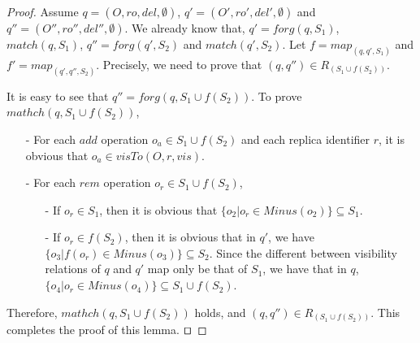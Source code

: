 \begin {proof}
Assume $q=(O,\mathit{ro},\mathit{del},\emptyset)$, $q'=(O',\mathit{ro}',\mathit{del}',\emptyset)$ and $q''=(O'',\mathit{ro}'',\mathit{del}'',\emptyset)$. We already know that, $q' = forg(q,S_1)$, $match(q,S_1)$, $q'' = forg(q',S_2)$ and $match(q',S_2)$. Let $f = map_{(q,q',S_1)}$ and $f' = map_{(q',q'',S_2)}$. Precisely, we need to prove that $(q,q'') \in R_{ ( S_1 \cup f(S_2) ) }$.

It is easy to see that $q'' = forg(q,S_1 \cup f(S_2))$. To prove $mathch(q,S_1 \cup f(S_2))$,

\begin{itemize}
\setlength{\itemsep}{0.5pt}
\item[-] For each $add$ operation $o_a \in S_1 \cup f(S_2)$ and each replica identifier $r$, it is obvious that $o_a \in visTo(O,r,vis)$.

\item[-] For each $rem$ operation $o_r \in S_1 \cup f(S_2)$,

    \begin{itemize}
    \setlength{\itemsep}{0.5pt}
    \item[-] If $o_r \in S_1$, then it is obvious that $\{ o_2 \vert o_r \in Minus(o_2) \} \subseteq S_1$.

    \item[-] If $o_r \in f(S_2)$, then it is obvious that in $q'$, we have $\{ o_3 \vert f(o_r) \in Minus(o_3) \} \subseteq S_2$. Since the different between visibility relations of $q$ and $q'$ map only be that of $S_1$, we have that in $q$, $\{ o_4 \vert o_r \in Minus(o_4) \} \subseteq S_1 \cup f(S_2)$.
    \end{itemize}
\end{itemize}

Therefore, $mathch(q,S_1 \cup f(S_2))$ holds, and $(q,q'') \in R_{ ( S_1 \cup f(S_2) ) }$. This completes the proof of this lemma. $\qed$
\end {proof}




